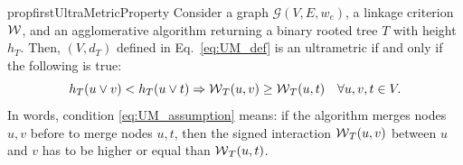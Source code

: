 \begin{restatable}{prop}{firstUltraMetricProperty}
\label{prop:ultraMetric1}
Consider a graph $\mathcal{G}(V,E,w_e)$, a linkage criterion $\mathcal{W}{}$, and an agglomerative algorithm returning a binary rooted tree $T$ with height $h_T$. Then, $(V, d_{T})$ defined in Eq.~\ref{eq:UM_def} is an ultrametric if and only if the following is true:
\begin{equation}\label{eq:UM_assumption}
 h_T(u \vee v) < h_T(u \vee t) \Rightarrow \mathcal{W}{}_{T}(u,v) \geq \mathcal{W}{}_{T}(u,t) \quad \forall u,v,t \in V.
\end{equation}
In words, condition \ref{eq:UM_assumption} means: if the algorithm merges nodes $u,v$ before to merge nodes $u,t$, then the signed interaction $\mathcal{W}{}_{T}(u,v)$ between $u$ and $v$ has to be higher or equal than $\mathcal{W}{}_{T}(u,t)$.
\end{restatable}
